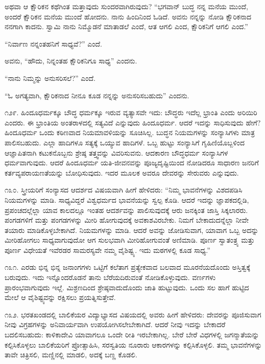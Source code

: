 ಅಥವಾ ಆ ಕ್ಷೌರಿಕನ ಕಥೆಗಿಂತ ಮತ್ತಾವುದು ಸುಂದರವಾಗಿರುವುದು? “ಭಗವಾನ್ ಬುದ್ಧ ನನ್ನ ಮನೆಯ ಮುಂದೆ, ಅಂದರೆ ಕ್ಷೌರಿಕನ ಮನೆಯ ಮುಂದೆ ಹೋದನು. ನಾನು ಹಿಂದಿನಿಂದ ಓಡಿದೆ. ಅವನು ನನ್ನನ್ನು ನೋಡಿ ಕ್ಷೌರಿಕನಾದ ನನಗಾಗಿ ಕಾದನು. ಸ್ವಾಮಿ ನಾನು ನಿಮ್ಮೊಡನೆ ಮಾತಾಡಲೆ ಎಂದೆ, ಆತ ಆಗಲಿ ಎಂದ, ಕ್ಷೌರಿಕನಿಗೆ ಆಗಲಿ ಎಂದ.”

“ನಿರ್ವಾಣ ನನ್ನಂತಹನಿಗೆ ಸಾಧ್ಯವೆ?” ಎಂದೆ.

ಅವನು, “ಹೌದು, ನಿನ್ನಂತಹ ಕ್ಷೌರಿಕನಿಗೂ ಸಾಧ್ಯ” ಎಂದನು.

“ನಾನು ನಿಮ್ಮನ್ನು ಅನುಸರಿಸಲೆ?” ಎಂದೆ.

“ಓ ಅಗತ್ಯವಾಗಿ, ಕ್ಷೌರಿಕನಾದ ನೀನೂ ಕೂಡ ನನ್ನನ್ನು ಅನುಸರಿಸಬಹುದು” ಎಂದನು.

೧೨೯. ಹಿಂದೂಧರ್ಮಕ್ಕೂ ಬೌದ್ಧ ಧರ್ಮಕ್ಕೂ ಇರುವ ವ್ಯತ್ಯಾಸವೇ ಇದು: ಬೌದ್ಧರು ಇದೆಲ್ಲ ಭ್ರಾಂತಿ ಎಂದು ಅರಿಯಿರಿ ಎಂದರು. ಈ ಭ್ರಾಂತಿಯ ಅಂತರಾಳದಲ್ಲಿ ಸತ್ಯವಿದೆ ಎನ್ನುವುದು ಹಿಂದೂಧರ್ಮ. ಆದರೆ ಇದನ್ನು ಸಾಧಿಸುವುದು ಹೇಗೆ? ಹಿಂದೂಧರ್ಮ ಒಂದು ಕಠಿಣವಾದ ನಿಯಮಾವಳಿಯನ್ನು ಸೂಚಿಸಿಲ್ಲ. ಬುದ್ಧನ ನಿಯಮಗಳನ್ನು ಸಂನ್ಯಾಸಿಗಳು ಮಾತ್ರ ಪಾಲಿಸಬಹುದು. ಎಲ್ಲಾ ಹಾದಿಗಳೂ ಸತ್ಯಕ್ಕೆ ಒಯ್ಯುವ ಹಾದಿಗಳೆ. ಒಬ್ಬ ಹುಟ್ಟು ಸಂನ್ಯಾಸಿಗೆ ಗೃಹಿಣಿಯೊಬ್ಬಳಿಂದ ಆಜ್ಞಾಪಿತನಾಗಿ ಕಟುಕನೊಬ್ಬನು ಶ್ರೇಷ್ಠ ತತ್ತ್ವವನ್ನು ವಿವರಿಸುವನು. ಆದಕಾರಣ ಬೌದ್ಧಧರ್ಮ ಸಂನ್ಯಾಸಿಗಳ ಧರ್ಮವಾಗುವುದು. ಆದರೆ ಹಿಂದೂಧರ್ಮ ಯತಿ-ಜೀವನವನ್ನು ಪೂಜ್ಯದೃಷ್ಟಿಯಿಂದ ನೋಡಿದರೂ ಸಾಧಾರಣ ಜನರಿಗೆ ಕರ್ತವ್ಯಪರಾಯಣತೆಯನ್ನು ಬೋಧಿಸುವುದು. ಇದರ ಮೂಲಕ ಅವರೂ ದೇವರನ್ನು ಸೇರುವರು ಎನ್ನುವುದು.

೧೩೦. ಸ್ತ್ರೀಯರಿಗೆ ಸಂನ್ಯಾಸದ ಆದರ್ಶದ ವಿಷಯವಾಗಿ ಹೀಗೆ ಹೇಳಿದರು: “ನಿಮ್ಮ ಭಾವನೆಗಳನ್ನು ವಿಶದಪಡಿಸಿ ನಿಯಮಗಳನ್ನು ಮಾಡಿ. ಸಾಧ್ಯವಿದ್ದರೆ ವಿಶ್ವಧರ್ಮದ ಭಾವನೆಯನ್ನು ಸ್ವಲ್ಪ ಕೊಡಿ. ಆದರೆ ಇದನ್ನು ಜ್ಞಾಪಕದಲ್ಲಿಡಿ, ಪ್ರಪಂಚದಲ್ಲೆಲ್ಲಾ ಯಾವ ಕಾಲದಲ್ಲೂ ಇಂತಹ ಆದರ್ಶವನ್ನು ಪಾಲಿಸುವುದಕ್ಕೆ ಆರು ಜನಕ್ಕಿಂತ ಜಾಸ್ತಿ ಸಿಕ್ಕಲಾರರು. ಪಂಗಡಗಳಿಗೆ ಮತ್ತು ಪಂಗಡಗಳನ್ನು ಮೀರಿ ಹೋಗುವುದಕ್ಕೆ ಅವಕಾಶವಿರಬೇಕು. ನಿಮಗೆ ಬೇಕಾದುದನ್ನೆಲ್ಲಾ ನೀವೇ ತಯಾರು ಮಾಡಿಕೊಳ್ಳಬೇಕಾಗಿದೆ. ನಿಯಮಗಳನ್ನು ಮಾಡಿ. ಆದರೆ ಅವನ್ನು ಜೋಡಿಸುವಾಗ, ಯಾವಾಗ ಒಬ್ಬ ಅದನ್ನು ಮೀರಿಹೋಗಲು ಸಾಧ್ಯವಾಗುವುದೋ ಆಗ ಸುಲಭವಾಗಿ ಮೀರಿಹೋಗುವಂತೆ ಅಣಿಮಾಡಿ. ಪೂರ್ಣ ಸ್ವಾತಂತ್ರ್ಯ ಮತ್ತು ಪೂರ್ಣ ವಿಧೇಯತೆ ಇವೆರಡರ ಸಾಮರಸ್ಯವೇ ನಮ್ಮ ವೈಶಿಷ್ಟ್ಯ. ಇದು ಮಠಗಳಲ್ಲಿ ಕೂಡ ಸಾಧ್ಯ.”

೧೩೧. ಎರಡು ಭಿನ್ನ ಭಿನ್ನ ಜನಾಂಗಗಳು ಒಟ್ಟಿಗೆ ಕಲೆತಾಗ ಪ್ರತ್ಯೇಕವಾದ ಬಲವಾದ ಮೂರನೆಯದೊಂದು ಅಸ್ತಿತ್ವಕ್ಕೆ ಬರುವುದು. ಇದು ಇನ್ನೊಂದರೊಡನೆ ತಾನು ಬೆರೆಯದಿರುವಂತೆ ನೋಡಿಕೊಳ್ಳುವುದು. ವರ್ಣಗಳು ಪ್ರಾರಂಭವಾಗುವುದು ಇಲ್ಲೆ. ಮಿಶ್ರಣದಿಂದ ಶ್ರೇಷ್ಠವಾದುದೊಂದು ಜಾತಿ ಹುಟ್ಟುವುದು. ಒಂದು ಸಲ ಹಾಗೆ ಹುಟ್ಟಿದ ಮೇಲೆ ಆ ವೈಶಿಷ್ಟ್ಯವನ್ನು ರಕ್ಷಿಸಲು ಪ್ರಯತ್ನಿಸುತ್ತೇವೆ.

೧೩೨. ಭರತಖಂಡದಲ್ಲಿ ಬಾಲಿಕೆಯರ ವಿದ್ಯಾಭ್ಯಾಸದ ವಿಷಯದಲ್ಲಿ ಅವರು ಹೀಗೆ ಹೇಳಿದರು: ದೇವರನ್ನು ಪೂಜಿಸುವಾಗ ನೀವು ವಿಗ್ರಹಗಳನ್ನು ಅನಿವಾರ್ಯವಾಗಿ ಉಪಯೋಗಿಸಲೇಬೇಕಾಗಿದೆ. ಆದರೆ ನೀವು ಇದನ್ನು ಬೇಕಾದರೆ ಬದಲಿಸಬಹುದು: ಕಾಳಿಕಾದೇವಿ ಯಾವಾಗಲೂ ಒಂದೇ ರೀತಿ ಇರಬೇಕಾಗಿಲ್ಲ. ಬೇರೆ ಬೇರೆ ವಿಧಗಳಲ್ಲಿ ಜಗನ್ಮಾತೆಯನ್ನು ಕಲ್ಪಿಸಿಕೊಳ್ಳಲು ಬಾಲಿಕೆಯರಿಗೆ ಪ್ರೋತ್ಸಾಹಿಸಿ, ಸರಸ್ವತಿಯ ನೂರಾರು ಆಕಾರಗಳನ್ನು ಕಲ್ಪಿಸಿಕೊಳ್ಳಲಿ. ತಮ್ಮ ಭಾವನೆಗಳನ್ನು ತಾವೇ ಚಿತ್ರಿಸಲಿ, ಮಣ್ಣಿನಲ್ಲಿ ಮಾಡಲಿ, ಅದಕ್ಕೆ ಬಣ್ಣ ಕೊಡಲಿ.

